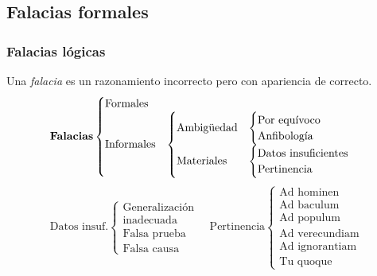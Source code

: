 \subsection{Falacias formales}

\subsubsection{Falacias lógicas}
Una \textit{falacia} es un razonamiento incorrecto pero con apariencia de correcto.
\[ \mbox{\textbf{Falacias}}
\begin{cases}
	\mbox{Formales}&\\
	\mbox{Informales} & \begin{cases}
		\mbox{Ambigüedad} & \begin{cases}
			\mbox{Por equívoco}&\\
			\mbox{Anfibología} & 
		\end{cases}\\
		\mbox{Materiales} & \begin{cases}
			\mbox{Datos insuficientes} & \\
			\mbox{Pertinencia}
		\end{cases}
	\end{cases}
\end{cases}	
\]
\vspace{-1mm}
\[ \mbox{Datos insuf.} \begin{cases}
	\mbox{Generalización}\\
	\mbox{inadecuada}\\
	\mbox{Falsa prueba}\\
	\mbox{Falsa causa}
\end{cases} \quad \mbox{Pertinencia} \begin{cases}
	\mbox{Ad hominen}\\
	\mbox{Ad baculum}\\
	\mbox{Ad populum}\\
	\mbox{Ad verecundiam}\\
	\mbox{Ad ignorantiam}\\
	\mbox{Tu quoque}
\end{cases}\]

